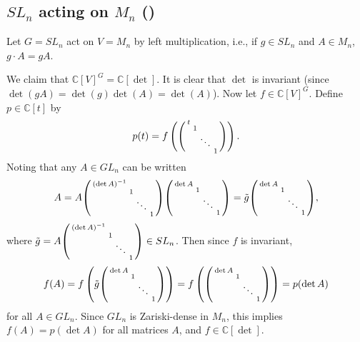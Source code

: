 \documentclass[12pt]{amsart}
\newcommand{\C}{\mathbb{C}}
\theoremstyle{remark}
\theoremstyle{remark}
\begin{document}
\subsection*{$SL_n$ acting on $M_n$ (\cite[\S 1.2]{KP96})}
Let $G = SL_n$ act on $V = M_n$ by left multiplication, i.e., if $g \in SL_n$ and $A \in M_n$, $g \cdot A = gA$.

We claim that $\C[V]^G = \C[\det]$.
It is clear that $\det$ is invariant (since $\det(gA) = \det(g) \det(A) = \det(A)$).
Now let $f \in \C[V]^G$.
Define $p \in \C[t]$ by
$$p(t) = f\left( 
\begin{psmallmatrix}
	t & & & \\
	   & 1 & & \\
	   & & \ddots & \\
	   & & & 1
\end{psmallmatrix}
\right).$$
Noting that any $A \in GL_n$ can be written
$$A = A
\begin{psmallmatrix}
	(\det A)^{-1} & & & \\
	   & 1 & & \\
	   & & \ddots & \\
	   & & & 1
\end{psmallmatrix}
\begin{psmallmatrix}
	\det A & & & \\
	   & 1 & & \\
	   & & \ddots & \\
	   & & & 1
\end{psmallmatrix}
=
\tilde g
\begin{psmallmatrix}
	\det A & & & \\
	   & 1 & & \\
	   & & \ddots & \\
	   & & & 1
\end{psmallmatrix},$$
where $\tilde g = A 
\begin{psmallmatrix}
	(\det A)^{-1} & & & \\
	   & 1 & & \\
	   & & \ddots & \\
	   & & & 1
\end{psmallmatrix} \in SL_n$.
Then since $f$ is invariant,
$$f(A) = f \left(\tilde g \begin{psmallmatrix}
	\det A & & & \\
	   & 1 & & \\
	   & & \ddots & \\
	   & & & 1
\end{psmallmatrix} \right)
=f \left(\begin{psmallmatrix}
	\det A & & & \\
	   & 1 & & \\
	   & & \ddots & \\
	   & & & 1
\end{psmallmatrix} \right)
= p(\det A)$$
for all $A \in GL_n$.
Since $GL_n$ is Zariski-dense in $M_n$, this implies $f(A) = p(\det A)$ for all matrices $A$, and $f \in \C[\det]$.
\end{document}
